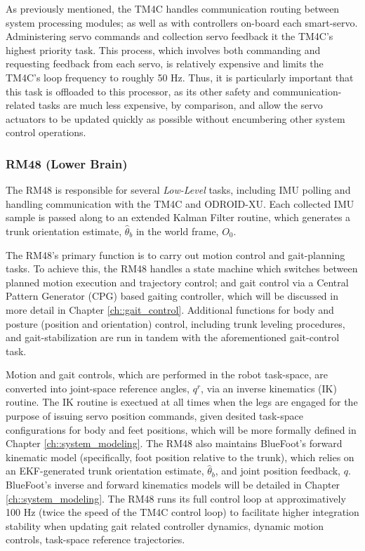 			As previously mentioned, the TM4C handles communication routing between system processing modules; as well as with controllers on-board each smart-servo. Administering servo commands and collection servo feedback it the TM4C's highest priority task. This process, which involves both commanding and requesting feedback from each servo, is relatively expensive  and limits the TM4C's loop frequency to roughly 50 Hz. Thus, it is particularly important that this task is offloaded to this processor, as its other safety and communication-related tasks are much less expensive, by comparison, and allow the servo actuators to be updated quickly as possible without encumbering other system control operations.


		\subsubsection{RM48 (Lower Brain)}

			The RM48 is responsible for several \emph{Low-Level} tasks, including IMU polling and handling communication with the TM4C and ODROID-XU. Each collected IMU sample is passed along to an extended Kalman Filter routine, which generates a trunk orientation estimate, $\hat{\theta}_{b}$ in the world frame, $O_{0}$. 

			The RM48's primary function is to carry out motion control and gait-planning tasks. To achieve this, the RM48 handles a state machine which switches between planned motion execution and trajectory control; and gait control via a Central Pattern Generator (CPG) based gaiting controller, which will be discussed in more detail in Chapter \ref{ch::gait_control}. Additional functions for body and posture (position and orientation) control, including trunk leveling procedures, and gait-stabilization are run in tandem with the aforementioned gait-control task.

			Motion and gait controls, which are performed in the robot task-space, are converted into joint-space reference angles, $q^{r}$, via an inverse kinematics (IK) routine. The IK routine is exectued at all times when the legs are engaged for the purpose of issuing servo position commands, given desited task-space configurations for body and feet positions, which will be more formally defined in Chapter \ref{ch::system_modeling}. The RM48 also maintains BlueFoot's forward kinematic model (specifically, foot position relative to the trunk), which relies on an EKF-generated trunk orientation estimate, $\hat{\theta}_{b}$, and joint position feedback, $q$. BlueFoot's inverse and forward kinematics models will be detailed in Chapter \ref{ch::system_modeling}. The RM48 runs its full control loop at approximatively 100 Hz (twice the speed of the TM4C control loop) to facilitate higher integration stability when updating gait related controller dynamics, dynamic motion controls, task-space reference trajectories.


